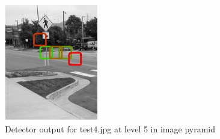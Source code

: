 \documentclass[11pt,psfig]{article}
\begin{document}
\begin{figure}[H]
\centering
\includegraphics[height=2in]{prob5b_plot2_level5.jpg}
\caption{Detector output for test4.jpg at level 5 in image pyramid}
\end{figure}
\end{document}
